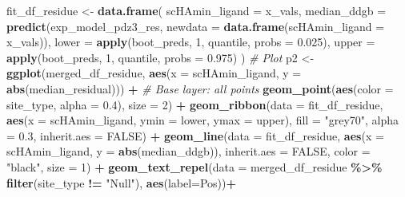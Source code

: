 \documentclass[
]{article}
\newenvironment{Shaded}{\begin{snugshade}}{\end{snugshade}}
\newcommand{\AttributeTok}[1]{\textcolor[rgb]{0.13,0.29,0.53}{#1}}
\newcommand{\CommentTok}[1]{\textcolor[rgb]{0.56,0.35,0.01}{\textit{#1}}}
\newcommand{\ConstantTok}[1]{\textcolor[rgb]{0.56,0.35,0.01}{#1}}
\newcommand{\DecValTok}[1]{\textcolor[rgb]{0.00,0.00,0.81}{#1}}
\newcommand{\FloatTok}[1]{\textcolor[rgb]{0.00,0.00,0.81}{#1}}
\newcommand{\FunctionTok}[1]{\textcolor[rgb]{0.13,0.29,0.53}{\textbf{#1}}}
\newcommand{\NormalTok}[1]{#1}
\newcommand{\OtherTok}[1]{\textcolor[rgb]{0.56,0.35,0.01}{#1}}
\newcommand{\SpecialCharTok}[1]{\textcolor[rgb]{0.81,0.36,0.00}{\textbf{#1}}}
\newcommand{\StringTok}[1]{\textcolor[rgb]{0.31,0.60,0.02}{#1}}
\begin{document}
\begin{Shaded}
\begin{Highlighting}[]
\NormalTok{fit\_df\_residue }\OtherTok{\textless{}{-}} \FunctionTok{data.frame}\NormalTok{(}
  \AttributeTok{scHAmin\_ligand =}\NormalTok{ x\_vals,}
  \AttributeTok{median\_ddgb =} \FunctionTok{predict}\NormalTok{(exp\_model\_pdz3\_res, }\AttributeTok{newdata =} \FunctionTok{data.frame}\NormalTok{(}\AttributeTok{scHAmin\_ligand =}\NormalTok{ x\_vals)),}
  \AttributeTok{lower =} \FunctionTok{apply}\NormalTok{(boot\_preds, }\DecValTok{1}\NormalTok{, quantile, }\AttributeTok{probs =} \FloatTok{0.025}\NormalTok{),}
  \AttributeTok{upper =} \FunctionTok{apply}\NormalTok{(boot\_preds, }\DecValTok{1}\NormalTok{, quantile, }\AttributeTok{probs =} \FloatTok{0.975}\NormalTok{)}
\NormalTok{)}
\CommentTok{\# Plot}
\NormalTok{p2 }\OtherTok{\textless{}{-}} \FunctionTok{ggplot}\NormalTok{(merged\_df\_residue, }\FunctionTok{aes}\NormalTok{(}\AttributeTok{x =}\NormalTok{ scHAmin\_ligand, }\AttributeTok{y =} \FunctionTok{abs}\NormalTok{(median\_residual))) }\SpecialCharTok{+}
  \CommentTok{\# Base layer: all points}
  \FunctionTok{geom\_point}\NormalTok{(}\FunctionTok{aes}\NormalTok{(}\AttributeTok{color =}\NormalTok{ site\_type, }\AttributeTok{alpha =} \FloatTok{0.4}\NormalTok{), }\AttributeTok{size =} \DecValTok{2}\NormalTok{) }\SpecialCharTok{+}
  \FunctionTok{geom\_ribbon}\NormalTok{(}\AttributeTok{data =}\NormalTok{ fit\_df\_residue,}
            \FunctionTok{aes}\NormalTok{(}\AttributeTok{x =}\NormalTok{ scHAmin\_ligand, }\AttributeTok{ymin =}\NormalTok{ lower, }\AttributeTok{ymax =}\NormalTok{ upper),}
            \AttributeTok{fill =} \StringTok{"grey70"}\NormalTok{, }\AttributeTok{alpha =} \FloatTok{0.3}\NormalTok{, }\AttributeTok{inherit.aes =} \ConstantTok{FALSE}\NormalTok{) }\SpecialCharTok{+}
  \FunctionTok{geom\_line}\NormalTok{(}\AttributeTok{data =}\NormalTok{ fit\_df\_residue, }\FunctionTok{aes}\NormalTok{(}\AttributeTok{x =}\NormalTok{ scHAmin\_ligand, }\AttributeTok{y =} \FunctionTok{abs}\NormalTok{(median\_ddgb)),}
          \AttributeTok{inherit.aes =} \ConstantTok{FALSE}\NormalTok{, }\AttributeTok{color =} \StringTok{"black"}\NormalTok{, }\AttributeTok{size =} \DecValTok{1}\NormalTok{) }\SpecialCharTok{+}
  \FunctionTok{geom\_text\_repel}\NormalTok{(}\AttributeTok{data =}\NormalTok{ merged\_df\_residue }\SpecialCharTok{\%\textgreater{}\%} \FunctionTok{filter}\NormalTok{(site\_type }\SpecialCharTok{!=} \StringTok{"Null"}\NormalTok{), }\FunctionTok{aes}\NormalTok{(}\AttributeTok{label=}\NormalTok{Pos))}\SpecialCharTok{+}
  

\end{Highlighting}
\end{Shaded}
\end{document}
